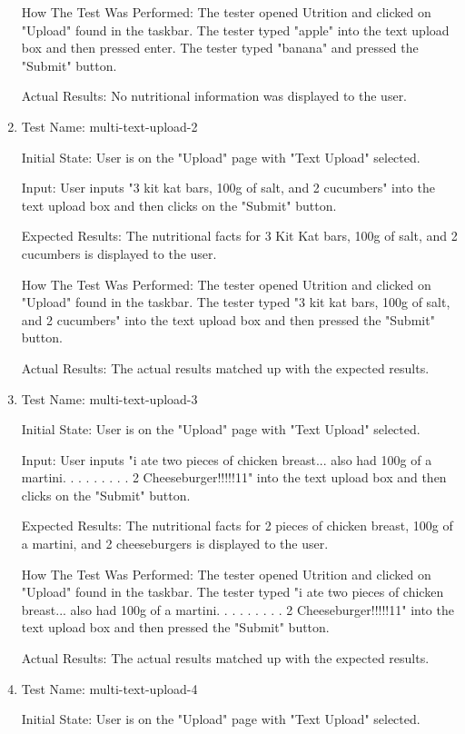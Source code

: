 \documentclass[12pt, titlepage]{article}
\begin{document}
\begin{enumerate}
		How The Test Was Performed: The tester opened Utrition and clicked on "Upload" found in the taskbar. The tester typed "apple" into the text upload box and then pressed enter. The tester typed "banana" and pressed the "Submit" button.
		
		Actual Results: No nutritional information was displayed to the user.
		
		\item{Test Name: multi-text-upload-2}
		
		Initial State: User is on the "Upload" page with "Text Upload" selected.
		
		Input: User inputs "3 kit kat bars, 100g of salt, and 2 cucumbers" into the text upload box and then clicks on the "Submit" button.
		
		Expected Results: The nutritional facts for 3 Kit Kat bars, 100g of salt, and 2 cucumbers is displayed to the user.
		
		How The Test Was Performed: The tester opened Utrition and clicked on "Upload" found in the taskbar. The tester typed "3 kit kat bars, 100g of salt, and 2 cucumbers" into the text upload box and then pressed the "Submit" button.
		
		Actual Results: The actual results matched up with the expected results.
		
		\item{Test Name: multi-text-upload-3}
		
		Initial State: User is on the "Upload" page with "Text Upload" selected.
		
		Input: User inputs "i ate two pieces of chicken breast... also had 100g of a martini. . . . . . . . . 2 Cheeseburger!!!!!11" into the text upload box and then clicks on the "Submit" button.
		
		Expected Results: The nutritional facts for 2 pieces of chicken breast, 100g of a martini, and 2 cheeseburgers is displayed to the user.
		
		How The Test Was Performed: The tester opened Utrition and clicked on "Upload" found in the taskbar. The tester typed "i ate two pieces of chicken breast... also had 100g of a martini. . . . . . . . . 2 Cheeseburger!!!!!11" into the text upload box and then pressed the "Submit" button.
		
		Actual Results: The actual results matched up with the expected results.
		
		\item{Test Name: multi-text-upload-4}
		
		Initial State: User is on the "Upload" page with "Text Upload" selected.
		

\end{enumerate}
\end{document}
